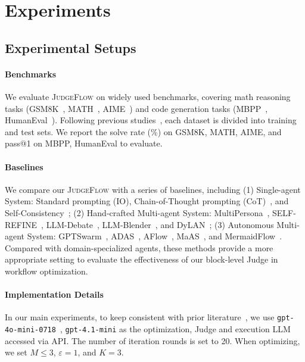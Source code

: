 \documentclass{article}
\theoremstyle{plain}
\theoremstyle{definition}
\theoremstyle{remark}
\def \our{\textsc{JudgeFlow}}
\begin{document}
\section{Experiments}
\subsection{Experimental Setups}
\paragraph{Benchmarks} We evaluate \our{} on widely used benchmarks, covering math reasoning tasks (GSM8K~\citep{cobbe_training_2021}, MATH~\citep{hendrycks_measuring_2021}, AIME~\citep{ye2025aimepreview}) and code generation tasks (MBPP~\citep{austin_program_2021}, HumanEval~\citep{chen_evaluating_2021}). Following previous studies~\citep{zhang_aflow_2025, zhang_multi-agent_2025}, each dataset is divided into training and test sets. We report the solve rate (\%) on GSM8K, MATH, AIME, and pass@1 on MBPP, HumanEval to evaluate.  

\paragraph{Baselines} We compare our \our{} with a series of baselines, including (1) Single-agent System: Standard prompting (IO), Chain-of-Thought prompting (CoT)~\citep{wei2023chainofthoughtpromptingelicitsreasoning}, and Self-Consistency~\citep{wang2023selfconsistencyimproveschainthought}; (2) Hand-crafted Multi-agent System: MultiPersona~\citep{wang2024unleashingemergentcognitivesynergy}, SELF-REFINE~\citep{madaan_self-refine_nodate}, LLM-Debate~\citep{du_improving_2023}, LLM-Blender~\citep{jiang2023llmblenderensemblinglargelanguage}, and DyLAN~\citep{liu_dynamic_2024}; (3) Autonomous Multi-agent System: GPTSwarm~\citep{zhuge_language_2024}, ADAS~\citep{hu_automated_2025}, AFlow~\citep{zhang_aflow_2025}, MaAS~\citep{zhang_multi-agent_2025}, and MermaidFlow~\citep{zheng_mermaidflow_2025}. Compared with domain-specialized agents, these methods provide a more appropriate setting to evaluate the effectiveness of our block-level Judge in workflow optimization.

\paragraph{Implementation Details} In our main experiments, to keep consistent with prior literature~\citep{zheng_mermaidflow_2025}, we use \texttt{gpt-4o-mini-0718}~\citep{openai_gpt4o_mini_2024}, \texttt{gpt-4.1-mini} \citep{openai_gpt41_mini_2025} as the optimization, Judge and execution LLM accessed via API. The number of iteration rounds is set to 20. When optimizing, we set $M \leq 3$, $\varepsilon=1$, and $K=3$. 
\end{document}
